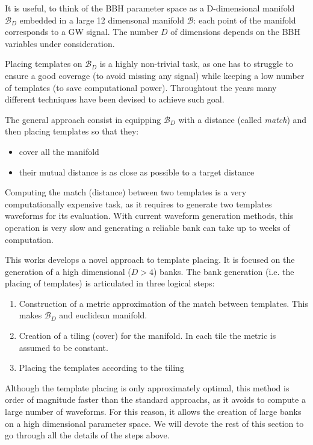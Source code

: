 \documentclass[twocolumn,showpacs,preprintnumbers,nofootinbib,prd,
superscriptaddress,10pt]{revtex4-1}
\begin{document}
It is useful, to think of the BBH parameter space as a D-dimensional manifold $\mathcal{B}_D$ embedded in a large 12 dimensonal manifold $\mathcal{B}$: each point of the manifold corresponds to a GW signal. The number $D$ of dimensions depends on the BBH variables under consideration.

Placing templates on $\mathcal{B}_D$ is a highly non-trivial task, as one has to struggle to ensure a good coverage (to avoid missing any signal) while keeping a low number of templates (to save computational power).
Throughtout the years many different techniques have been devised to achieve such goal.

The general approach consist in equipping $\mathcal{B}_D$ with a distance (called {\it match}) and then placing templates so that they:
\begin{itemize}
	\item cover all the manifold
	\item their mutual distance is as close as possible to a target distance
\end{itemize}
Computing the match (distance) between two templates is a very computationally expensive task, as it requires to generate two templates waveforms for its evaluation. With current waveform generation methods, this operation is very slow and generating a reliable bank can take up to weeks of computation.

This works develops a novel approach to template placing. It is focused on the generation of a high dimensional ($D>4$) banks.
The bank generation (i.e. the placing of templates) is articulated in three logical steps:

\begin{enumerate}
	\item Construction of a metric approximation of the match between templates. This makes $\mathcal{B}_D$ and euclidean manifold.
	\item Creation of a tiling (cover) for the manifold. In each tile the metric is assumed to be constant.
	\item Placing the templates according to the tiling
\end{enumerate}

Although the template placing is only approximately optimal, this method is order of magnitude faster than the standard approachs, as it avoids to compute a large number of waveforms. For this reason, it allows the creation of large banks on a high dimensional parameter space.
We will devote the rest of this section to go through all the details of the steps above.
\end{document}
